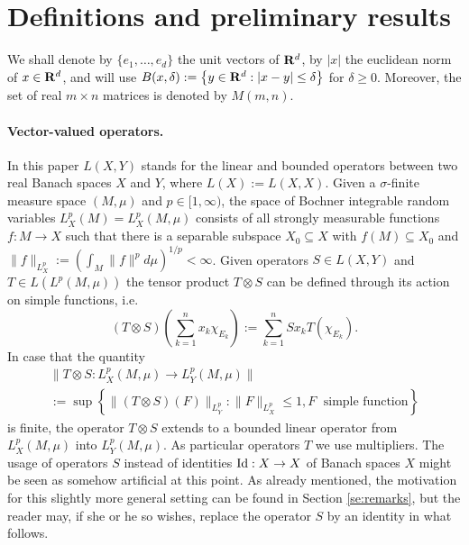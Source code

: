 \documentclass[11pt,a4paper,twoside,draft]{amsart}
\theoremstyle{definition}
\newcommand{\real}{{\bf R}}
\begin{document}

\section{Definitions and preliminary results}
\label{se:definitions}

We shall denote by $\{ e_1,\ldots ,e_d\}$ the unit vectors of $\real^d$,
by $|x|$ the euclidean norm of $x\in\real^d$, and will use 
$B(x,\delta):= \left \{ y\in\real^d : |x-y|\le\delta \right \}$ 
for $\delta\ge 0$. Moreover, the set of real $m\times n$ matrices is 
denoted by $M(m,n).$
\medskip 

\paragraph{{\bf Vector-valued operators}.}  In this paper $L(X,Y)$ stands 
for the linear and bounded operators between two real Banach spaces $X$ and $Y$, 
where $L(X):=L(X,X)$. Given a $\sigma$-finite measure space
$(M,\mu)$ and $p\in [1,\infty)$, the space of Bochner integrable random variables 
$L^p_X(M)=L^p_X(M,\mu )$ consists of all 
strongly measurable functions  $f:M \rightarrow X$ such that there is a
separable subspace $X_0 \subseteq X$ with $f(M) \subseteq X_0$ and 
$   \| f\|_{L^p_X} 
 := \left ( \int_M \| f \|^p d\mu \right )^{{1}/{p}}
  < \infty$.
Given operators  $S\in L(X,Y)$ and $T\in L(L^p(M,\mu))$
the tensor product $T\otimes S$  can be defined 
through its action on simple functions, i.e.
\[     (T\otimes S)\left ( \sum_{k=1}^n x_k\chi_{E_k}\right) 
    := \sum_{k=1}^n Sx_kT(\chi_{E_k}). \]
In case that the quantity
\begin{multline*}
      \|T \otimes S:L^p_X(M,\mu) \rightarrow L^p_Y(M,\mu)\| \\
   := \sup \left \{ \|  (T\otimes S) (F) \|_{L^p_Y} : \| F\|_{L^p_X} \le 1,
                       F \;\mbox{ simple function}\right \}
\end{multline*}
is finite, the operator $T\otimes S$ extends to a bounded linear operator from
$L_X^p(M,\mu)$ into $L_Y^p(M,\mu)$. As particular operators $T$ we use 
multipliers. 
The usage of operators $S$ instead of identities ${\rm Id}:X\to X$ of Banach 
spaces $X$ might be seen as somehow artificial at this point. 
As already mentioned, the motivation for this slightly more general setting can be found in 
Section \ref{se:remarks}, but the reader may, if she or he so wishes, replace the 
operator $S$ by an identity in what follows. 
\bigskip
\end{document}
